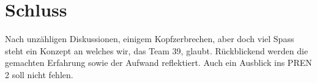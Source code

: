 \section{Schluss}
Nach unzähligen Diskussionen, einigem Kopfzerbrechen, aber doch viel Spass steht ein Konzept an welches wir, das Team 39, glaubt. Rückblickend werden die gemachten Erfahrung sowie der Aufwand reflektiert. Auch ein Ausblick ins PREN 2 soll nicht fehlen.





